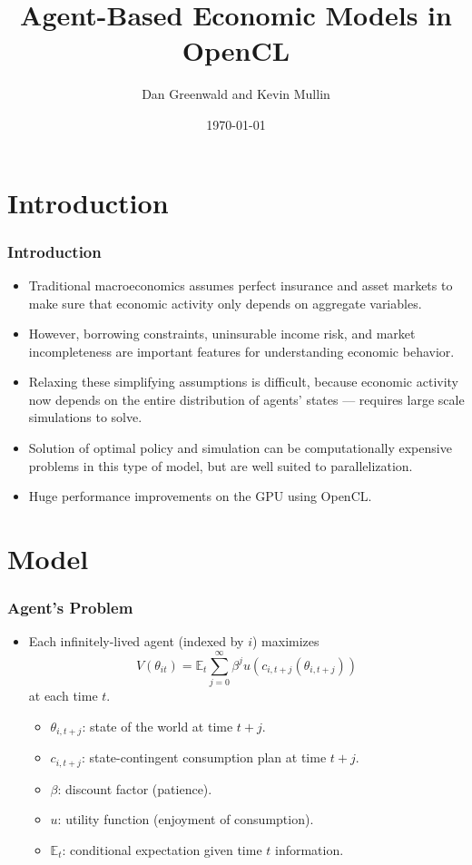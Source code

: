 \documentclass[handout]{beamer}
\title{Agent-Based Economic Models in OpenCL}
\author{Dan Greenwald and Kevin Mullin}
\date{\today}
\newcommand{\E}{\mathbb{E}}
\theoremstyle{definition}
\begin{document}
\small

\frame{\titlepage}

\section{Introduction}

\begin{frame}
  \frametitle{Introduction}
  \begin{itemize}[<+->]
  \item Traditional macroeconomics assumes perfect insurance and asset markets to make sure that economic activity only depends on aggregate variables.
  \item However, borrowing constraints, uninsurable income risk, and market incompleteness are important features for understanding economic behavior.
  \item Relaxing these simplifying assumptions is difficult, because economic activity now depends on the entire distribution of agents' states --- requires large scale simulations to solve.
  \item Solution of optimal policy and simulation can be computationally expensive problems in this type of model, but are well suited to parallelization.
  \item Huge performance improvements on the GPU using OpenCL.
  \end{itemize}
\end{frame}

\section{Model}

\begin{frame}
  \frametitle{Agent's Problem}
  \begin{itemize}[<+->]
  \item Each infinitely-lived agent (indexed by $i$) maximizes
    \[ V(\theta_{it}) = \E_t \sum_{j=0}^\infty \beta^j u(c_{i,t+j}(\theta_{i,t+j})) \]
    at each time $t$.
    \begin{itemize}[<+->]
    \item $\theta_{i,t+j}$: state of the world at time $t+j$.
    \item $c_{i,t+j}$: state-contingent consumption plan at time $t+j$.
    \item $\beta$: discount factor (patience).
    \item $u$: utility function (enjoyment of consumption).
    \item $\E_t$: conditional expectation given time $t$ information.
    \end{itemize}
  \end{itemize}
\end{frame}
\end{document}
